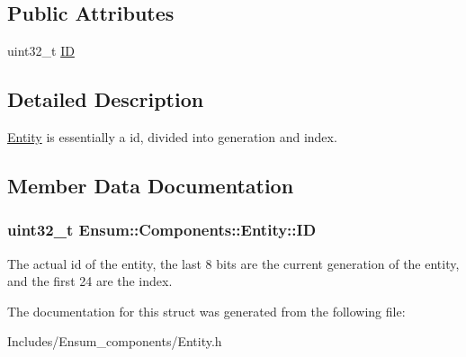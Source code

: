 \subsection*{Public Attributes}
\begin{DoxyCompactItemize}
\item 
uint32\+\_\+t \hyperlink{struct_ensum_1_1_components_1_1_entity_a89fe2a4a8002457a754b7ba63804bf2a}{ID}
\end{DoxyCompactItemize}


\subsection{Detailed Description}
\hyperlink{struct_ensum_1_1_components_1_1_entity}{Entity} is essentially a id, divided into generation and index. 

\subsection{Member Data Documentation}
\subsubsection[{\texorpdfstring{ID}{ID}}]{\setlength{\rightskip}{0pt plus 5cm}uint32\+\_\+t Ensum\+::\+Components\+::\+Entity\+::\+ID}\hypertarget{struct_ensum_1_1_components_1_1_entity_a89fe2a4a8002457a754b7ba63804bf2a}{}\label{struct_ensum_1_1_components_1_1_entity_a89fe2a4a8002457a754b7ba63804bf2a}
The actual id of the entity, the last 8 bits are the current generation of the entity, and the first 24 are the index. 

The documentation for this struct was generated from the following file\+:\begin{DoxyCompactItemize}
\item 
Includes/\+Ensum\+\_\+components/Entity.\+h\end{DoxyCompactItemize}
